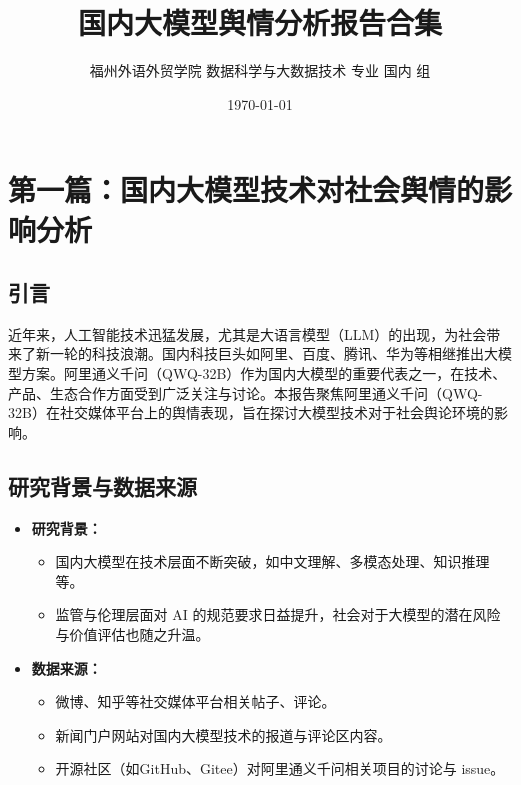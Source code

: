 \documentclass[12pt,a4paper]{ctexart}
\title{\textbf{国内大模型舆情分析报告合集}}
\author{福州外语外贸学院 数据科学与大数据技术 专业 国内 组}
\date{\today}
\begin{document}
\maketitle
\tableofcontents
\newpage

\section{第一篇：国内大模型技术对社会舆情的影响分析}
\subsection{引言}
近年来，人工智能技术迅猛发展，尤其是大语言模型（LLM）的出现，为社会带来了新一轮的科技浪潮。国内科技巨头如阿里、百度、腾讯、华为等相继推出大模型方案。阿里通义千问（QWQ-32B）作为国内大模型的重要代表之一，在技术、产品、生态合作方面受到广泛关注与讨论。本报告聚焦阿里通义千问（QWQ-32B）在社交媒体平台上的舆情表现，旨在探讨大模型技术对于社会舆论环境的影响。

\subsection{研究背景与数据来源}
\begin{itemize}
    \item \textbf{研究背景：}
    \begin{itemize}
        \item 国内大模型在技术层面不断突破，如中文理解、多模态处理、知识推理等。
        \item 监管与伦理层面对 AI 的规范要求日益提升，社会对于大模型的潜在风险与价值评估也随之升温。
    \end{itemize}
    \item \textbf{数据来源：}
    \begin{itemize}
        \item 微博、知乎等社交媒体平台相关帖子、评论。
        \item 新闻门户网站对国内大模型技术的报道与评论区内容。
        \item 开源社区（如GitHub、Gitee）对阿里通义千问相关项目的讨论与 issue。
    \end{itemize}
\end{itemize}
\end{document}
